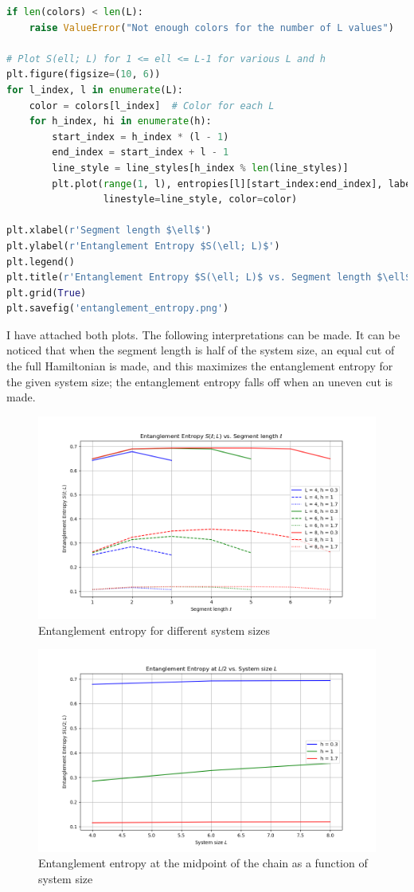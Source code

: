 \documentclass[12pt]{article}
\begin{document}
\begin{lstlisting}[language=Python]
if len(colors) < len(L):
    raise ValueError("Not enough colors for the number of L values")

# Plot S(ell; L) for 1 <= ell <= L-1 for various L and h
plt.figure(figsize=(10, 6))
for l_index, l in enumerate(L):
    color = colors[l_index]  # Color for each L
    for h_index, hi in enumerate(h):
        start_index = h_index * (l - 1)
        end_index = start_index + l - 1
        line_style = line_styles[h_index % len(line_styles)]
        plt.plot(range(1, l), entropies[l][start_index:end_index], label=f'L = {l}, h = {hi}',
                 linestyle=line_style, color=color)

plt.xlabel(r'Segment length $\ell$')
plt.ylabel(r'Entanglement Entropy $S(\ell; L)$')
plt.legend()
plt.title(r'Entanglement Entropy $S(\ell; L)$ vs. Segment length $\ell$')
plt.grid(True)
plt.savefig('entanglement_entropy.png')
\end{lstlisting}
I have attached both plots. The following interpretations can be made. It can be noticed that when the segment length is half of the system size, an equal cut of the full Hamiltonian is made, and this maximizes the entanglement entropy for the given system size; the entanglement entropy falls off when an uneven cut is made.
\begin{figure}
\centering
\includegraphics[width=\textwidth]{entanglement_entropy.png}
\caption{Entanglement entropy for different system sizes}
\end{figure}
\begin{figure}
\centering
\includegraphics[width=\textwidth]{entanglement_entropy_L2.png}
\caption{Entanglement entropy at the midpoint of the chain as a function of system size}
\end{figure}
\end{document}
